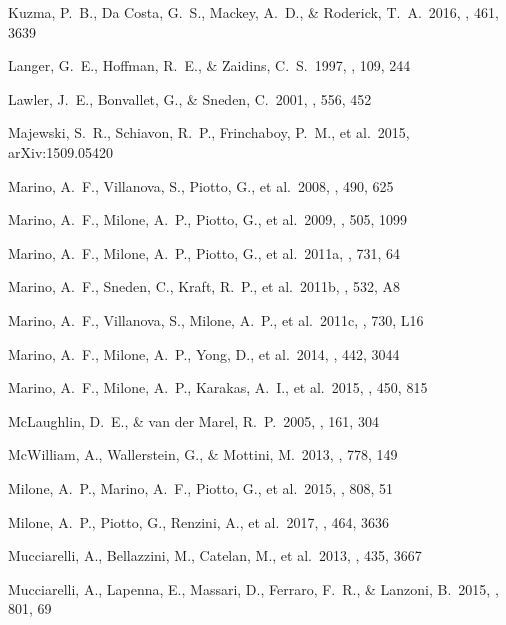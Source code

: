 \documentclass[12pt,preprint]{emulateapj}
\begin{document}
\begin{thebibliography}{}
 Kuzma, P.~B., Da Costa, G.~S., Mackey, A.~D., \& Roderick, T.~A.\ 2016, \mnras, 461, 3639

 Langer, G.~E., Hoffman, R.~E., \& Zaidins, C.~S.\ 1997, \pasp, 109, 244

 Lawler, J.~E., Bonvallet, G., \& Sneden, C.\ 2001, \apj, 556, 452

 Majewski, S.~R., Schiavon, R.~P., Frinchaboy, P.~M., et al.\ 2015, arXiv:1509.05420

 Marino, A.~F., Villanova, S., Piotto, G., et al.\ 2008, \aap, 490, 625

 Marino, A.~F., Milone, A.~P., Piotto, G., et al.\ 2009, \aap, 505, 1099

 Marino, A.~F., Milone, A.~P., Piotto, G., et al.\ 2011a, \apj, 731, 64

 Marino, A.~F., Sneden, C., Kraft, R.~P., et al.\ 2011b, \aap, 532, A8

 Marino, A.~F., Villanova, S., Milone, A.~P., et al.\ 2011c, \apjl, 730, L16

 Marino, A.~F., Milone, A.~P., Yong, D., et al.\ 2014, \mnras, 442, 3044

 Marino, A.~F., Milone, A.~P., Karakas, A.~I., et al.\ 2015, \mnras, 450, 815

 McLaughlin, D.~E., \& van der Marel, R.~P.\ 2005, \apjs, 161, 304

 McWilliam, A., Wallerstein, G., \& Mottini, M.\ 2013, \apj, 778, 149

 Milone, A.~P., Marino, A.~F., Piotto, G., et al.\ 2015, \apj, 808, 51

 Milone, A.~P., Piotto, G., Renzini, A., et al.\ 2017, \mnras, 464, 3636

 Mucciarelli, A., Bellazzini, M., Catelan, M., et al.\ 2013, \mnras, 435, 3667

 Mucciarelli, A., Lapenna, E., Massari, D., Ferraro, F.~R., \& Lanzoni, B.\ 2015, \apj, 801, 69


\end{thebibliography}
\end{document}
